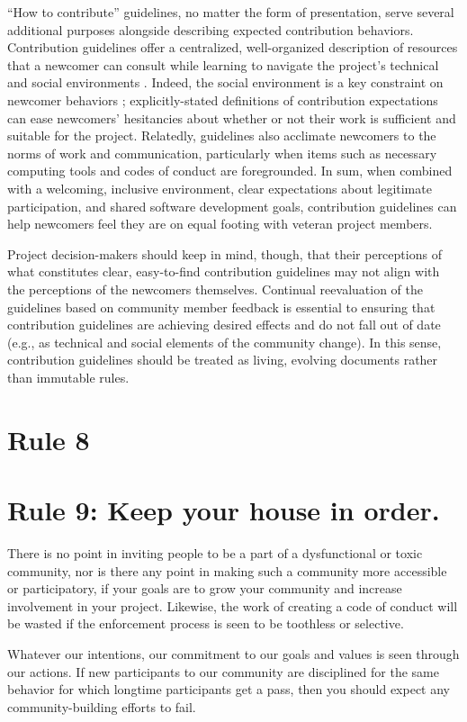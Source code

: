 \documentclass[10pt,letterpaper]{article}
\newcommand{\rulemajor}[1]{\section{#1}}
\begin{document}
``How to contribute'' guidelines,
no matter the form of presentation,
serve several additional purposes alongside describing expected contribution behaviors.
Contribution guidelines offer a centralized, well-organized description of resources
that a newcomer can consult while learning to navigate the project's technical and social environments \cite{zanatta2017}.
Indeed, the social environment is a key constraint on newcomer behaviors \cite{steinmacher2015};
explicitly-stated definitions of contribution expectations can ease newcomers' hesitancies
about whether or not their work is sufficient and suitable for the project.
Relatedly,
guidelines also acclimate newcomers to the norms of work and communication,
particularly when items such as necessary computing tools and codes of conduct are foregrounded.
In sum,
when combined with a welcoming, inclusive environment,
clear expectations about legitimate participation,
and shared software development goals,
contribution guidelines can help newcomers feel they are on equal footing with veteran project members.

Project decision-makers should keep in mind,
though,
that their perceptions of what constitutes clear, easy-to-find contribution guidelines
may not align with the perceptions of the newcomers themselves.
Continual reevaluation of the guidelines based on community member feedback is essential
to ensuring that contribution guidelines are achieving desired effects
and do not fall out of date (e.g., as technical and social elements of the community change).
In this sense,
contribution guidelines should be treated as living, evolving documents rather than immutable rules.

\rulemajor{Rule 8}

\rulemajor{Rule 9: Keep your house in order.}

There is no point in inviting people to be a part of a dysfunctional or toxic community,
nor is there any point in making such a community more accessible or participatory,
if your goals are to grow your community and increase involvement in your project.
Likewise,
the work of creating a code of conduct will be wasted
if the enforcement process is seen to be toothless or selective.

Whatever our intentions,
our commitment to our goals and values is seen through our actions.
If new participants to our community are disciplined for the same behavior
for which longtime participants get a pass,
then you should expect any community-building efforts to fail.
\end{document}
